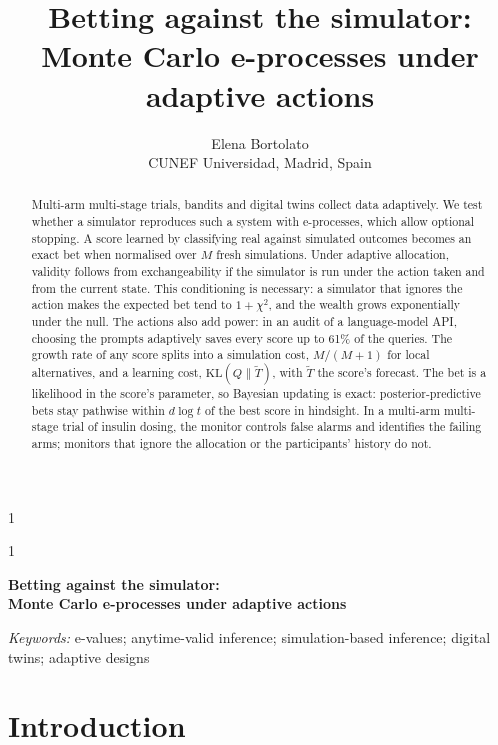 \documentclass[12pt]{article}
\newcommand{\KL}{\mathrm{KL}}
\theoremstyle{remark}
\newcommand{\blind}{1}
\def\spacingset#1{\renewcommand{\baselinestretch}%
{#1}\small\normalsize} \spacingset{1}
\begin{document}
\blind
{
  \title{\bf Betting against the simulator:\\
  Monte Carlo e-processes under adaptive actions}
  \author{Elena Bortolato\\
    CUNEF Universidad, Madrid, Spain}
  \date{}
  \maketitle
} \fi

\blind
{
  \bigskip
  \bigskip
  \bigskip
  \begin{center}
    {\LARGE\bf Betting against the simulator:\\[4pt]
    Monte Carlo e-processes under adaptive actions}
  \end{center}
  \medskip
} \fi

\bigskip
\begin{abstract}
Multi-arm multi-stage trials, bandits and digital twins collect data
adaptively. We test whether a simulator reproduces such a system with
e-processes, which allow optional stopping. A score learned by classifying real
against simulated outcomes becomes an exact bet when normalised over $M$ fresh
simulations. Under adaptive allocation, validity follows from exchangeability
if the simulator is run under the action taken and from the current state.
This conditioning is necessary: a simulator that ignores the action makes the
expected bet tend to $1+\chi^2$, and the wealth grows exponentially under the
null. The actions also add power: in an audit of a language-model API,
choosing the prompts adaptively saves every score up to 61\% of the queries.
The growth rate of any score splits into a simulation cost, $M/(M+1)$ for local
alternatives, and a learning cost, $\KL(Q\|\tilde T)$, with $\tilde T$ the
score's forecast. The bet is a likelihood in the score's parameter, so Bayesian
updating is exact: posterior-predictive bets stay pathwise within $d\log t$ of
the best score in hindsight. In a multi-arm multi-stage trial of insulin
dosing, the monitor controls false alarms and identifies the failing arms;
monitors that ignore the allocation or the participants' history do not.
\end{abstract}

\noindent%
{\it Keywords:} e-values; anytime-valid inference; simulation-based inference;
digital twins; adaptive designs
\vfill

\newpage
\spacingset{1.45}
\section{Introduction}\label{sec:intro}
\end{document}
